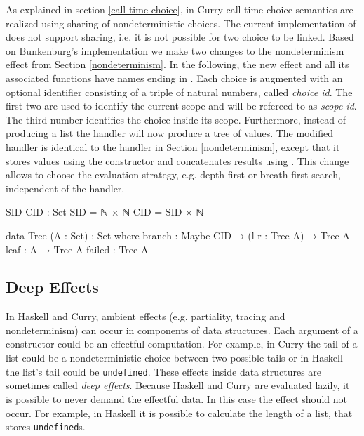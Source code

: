 As explained in section \ref{call-time-choice}, in Curry call-time choice
semantics are realized using sharing of nondeterministic choices.
The current implementation of  does not support sharing,
i.e. it is not possible for two choice to be linked.
Based on Bunkenburg's implementation we make two changes to the
nondeterminism effect from Section \ref{nondeterminism}.
In the following, the new effect and all its associated functions have names
ending in .
Each choice is augmented with an optional identifier consisting of a triple of
natural numbers, called \textit{choice id}.
The first two are used to identify the current scope and will be refereed to as
\textit{scope id}.
The third number identifies the choice inside its scope.
Furthermore, instead of producing a list the handler will now produce a tree of
values.
The modified handler is identical to the handler in Section
\ref{nondeterminism}, except that it stores values using the
 constructor and concatenates results using
.
This change allows to choose the evaluation strategy, e.g. depth first or breath
first search, independent of the handler.

\begin{code}
SID CID : Set
SID = ℕ × ℕ
CID = SID × ℕ

data Tree (A : Set) : Set where
  branch  : Maybe CID → (l r : Tree A) → Tree A
  leaf    : A → Tree A
  failed  : Tree A
\end{code}

\subsection{Deep Effects}
\label{first-order:deep-effects}

In Haskell and Curry, ambient effects (e.g. partiality, tracing and
nondeterminism) can occur in components of data structures.
Each argument of a constructor could be an effectful computation.
For example, in Curry the tail of a list could be a nondeterministic choice
between two possible tails or in Haskell the list's tail could be
\texttt{undefined}.
These effects inside data structures are sometimes called \textit{deep effects}.
Because Haskell and Curry are evaluated lazily, it is possible to never demand
the effectful data.
In this case the effect should not occur.
For example, in Haskell it is possible to calculate the length of a list, that
stores \texttt{undefined}s.

